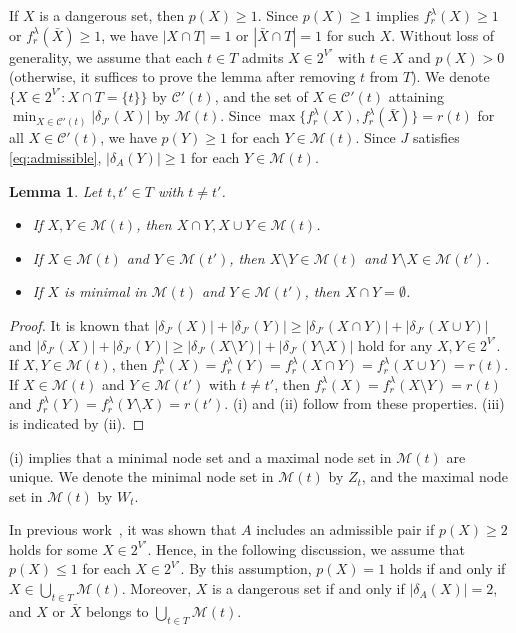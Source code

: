 \documentclass{article}
\newtheorem{lemma}{Lemma}
\newcommand{\Cfam}{\mathcal{C}}
\newcommand{\Mfam}{\mathcal{M}}
\newcommand{\g}{f^{\lambda}}
\begin{document}
If $X$ is a dangerous set,
then $p(X)\geq 1$. Since $p(X) \geq 1$ implies
$\g_r(X)\geq 1$ or $\g_r(\bar{X})\geq 1$,
we have $|X \cap T|=1$ or $|\bar{X} \cap T|=1$ for such $X$.
Without loss of generality, we assume that
each $t \in T$ admits $X \in 2^{V'}$ with $t\in X$ and $p(X)>0$
(otherwise, it suffices to prove the lemma after removing $t$ from $T$).
We denote 
$\{X \in 2^{V'} \colon X \cap T = \{t\}\}$ by $\Cfam'(t)$,
and the set of $X \in \Cfam'(t)$ attaining $\min_{X \in \Cfam'(t)}|\delta_{J'}(X)|$
by $\Mfam(t)$.
Since $\max\{\g_r(X),\g_r(\bar{X})\}=r(t)$ for all $X \in \Cfam'(t)$,
we have $p(Y) \geq 1$ for each $Y \in \Mfam(t)$.
Since $J$ satisfies \eqref{eq:admissible},
$|\delta_A(Y)|\geq 1$ for each $Y \in \Mfam(t)$.

\begin{lemma}\label{lemm.uncrossing-core}
 Let $t,t' \in T$ with $t \neq t'$.
 \begin{itemize}
  \item[\rm (i)] If $X,Y \in \Mfam(t)$, then $X \cap Y,X\cup Y \in \Mfam(t)$.
  \item[\rm (ii)] If $X \in \Mfam(t)$ and $Y \in \Mfam(t')$, then
	$X \setminus Y \in \Mfam(t)$ and $Y \setminus X \in \Mfam(t')$.
  \item[\rm (iii)] If $X$ is minimal in $\Mfam(t)$ and $Y \in \Mfam(t')$,
	then $X \cap Y=\emptyset$.
 \end{itemize}
\end{lemma}
\begin{proof}
 It is known that
 $|\delta_{J'}(X)|+|\delta_{J'}(Y)| \geq |\delta_{J'}(X \cap
 Y)|+|\delta_{J'}(X \cup Y)|$
 and
  $|\delta_{J'}(X)|+|\delta_{J'}(Y)| \geq |\delta_{J'}(X \setminus Y)|+|\delta_{J'}(Y \setminus X)|$
 hold for any $X,Y \in 2^{V'}$.
 If $X,Y \in \Mfam(t)$, then $\g_r(X)=\g_r(Y)=\g_r(X\cap Y)=\g_r(X\cup
 Y)=r(t)$.
 If $X\in \Mfam(t)$ and $Y\in \Mfam(t')$ with $t\neq t'$,
 then $\g_r(X)=\g_r(X\setminus Y)=r(t)$ and $\g_r(Y)=\g_r(Y\setminus X)=r(t')$.
  (i) and (ii) follow from these properties.
 (iii) is indicated by (ii).
\end{proof}

(i) implies that a minimal node set and a maximal node set in $\Mfam(t)$
are unique.
We denote the minimal node set in $\Mfam(t)$ by $Z_t$, and the maximal
node set in $\Mfam(t)$ by $W_t$.

In previous work~\cite{Nutov2009,Bernath2012}, it was shown that $A$ includes an admissible pair
if $p(X) \geq 2$ holds for some $X\in 2^{V'}$.
Hence, in the following discussion, we assume that $p(X)\leq 1$ for each $X \in 2^{V'}$.
By this assumption, 
$p(X)=1$ holds if and only if $X \in \bigcup_{t \in T}\Mfam(t)$. Moreover,
$X$ is a dangerous set if and only if
$|\delta_A(X)|=2$, and 
$X$ or $\bar{X}$ belongs to $\bigcup_{t \in T}\Mfam(t)$.
\end{document}
